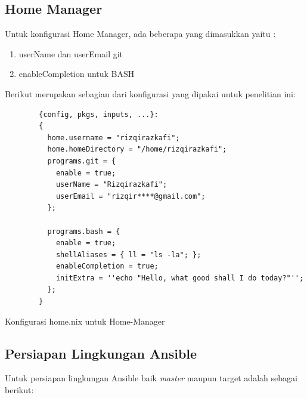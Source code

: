 \documentclass[10pt,twoside]{report}
\newenvironment{code}{\captionsetup{type=listing}}{\vspace{3mm}}
\begin{document}
\begin{adjustwidth}{20pt}{}
	\subsection{Home Manager}
	\vspace{-3mm}
	\begin{adjustwidth}{20pt}{}
		Untuk konfigurasi Home Manager, ada beberapa yang dimasukkan yaitu :
		\begin{enumerate}
			\item userName dan userEmail git
			\item enableCompletion untuk BASH
		\end{enumerate}

		Berikut merupakan sebagian dari konfigurasi yang dipakai untuk penelitian ini:

		\begin{code}
			\begin{verbatim}
        {config, pkgs, inputs, ...}:
        {
          home.username = "rizqirazkafi";
          home.homeDirectory = "/home/rizqirazkafi";
          programs.git = {
            enable = true;
            userName = "Rizqirazkafi";
            userEmail = "rizqir****@gmail.com";
          };

          programs.bash = {
            enable = true;
            shellAliases = { ll = "ls -la"; };
            enableCompletion = true;
            initExtra = ''echo "Hello, what good shall I do today?"'';
          };
        }
      \end{verbatim}
			\caption{Konfigurasi home.nix untuk Home-Manager}
		\end{code}
	\end{adjustwidth}
	\subsection{Persiapan Lingkungan Ansible}
	\begin{adjustwidth}{20pt}{}
		Untuk persiapan lingkungan Ansible baik \textit{master} maupun target adalah
		sebagai berikut:
	\end{adjustwidth}

\end{adjustwidth}
\end{document}
